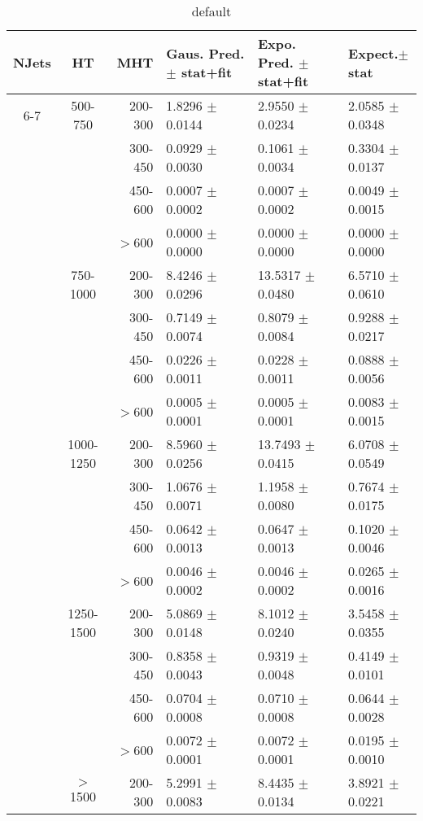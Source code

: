 \documentclass[11pt]{amsart}
\begin{document}
\begin{table}[htdp]
\caption{default}
\begin{center}
\begin{tabular}{|c|c|r|l|l|l|}
\hline

NJets & 	HT 	& MHT 		& Gaus. Pred. $\pm$ stat+fit	& Expo. Pred. $\pm$stat+fit	& Expect.$\pm$stat\\
\hline
6-7& 500-750	& 200-300 & 	1.8296 $\pm$ 0.0144  & 	2.9550 $\pm$ 0.0234  & 	2.0585 $\pm$ 0.0348 \\
  	&				& 300-450 & 	0.0929 $\pm$ 0.0030  & 	0.1061 $\pm$ 0.0034  & 	0.3304 $\pm$ 0.0137 \\
  	&				& 450-600 & 	0.0007 $\pm$ 0.0002  & 	0.0007 $\pm$ 0.0002  & 	0.0049 $\pm$ 0.0015 \\
  	&				& $>$600 & 	0.0000 $\pm$ 0.0000  & 	0.0000 $\pm$ 0.0000  & 	0.0000 $\pm$ 0.0000 \\
  	& 750-1000	& 200-300 & 	8.4246 $\pm$ 0.0296  & 	13.5317 $\pm$ 0.0480  & 	6.5710 $\pm$ 0.0610 \\
  	&				& 300-450 & 	0.7149 $\pm$ 0.0074  & 	0.8079 $\pm$ 0.0084  & 	0.9288 $\pm$ 0.0217 \\
  	&				& 450-600 & 	0.0226 $\pm$ 0.0011  & 	0.0228 $\pm$ 0.0011  & 	0.0888 $\pm$ 0.0056 \\
  	&				& $>$600 & 	0.0005 $\pm$ 0.0001  & 	0.0005 $\pm$ 0.0001  & 	0.0083 $\pm$ 0.0015 \\
  	& 1000-1250	& 200-300 & 	8.5960 $\pm$ 0.0256  & 	13.7493 $\pm$ 0.0415  & 	6.0708 $\pm$ 0.0549 \\
  	&				& 300-450 & 	1.0676 $\pm$ 0.0071  & 	1.1958 $\pm$ 0.0080  & 	0.7674 $\pm$ 0.0175 \\
  	&				& 450-600 & 	0.0642 $\pm$ 0.0013  & 	0.0647 $\pm$ 0.0013  & 	0.1020 $\pm$ 0.0046 \\
  	&				& $>$600 & 	0.0046 $\pm$ 0.0002  & 	0.0046 $\pm$ 0.0002  & 	0.0265 $\pm$ 0.0016 \\
  	& 1250-1500	& 200-300 & 	5.0869 $\pm$ 0.0148  & 	8.1012 $\pm$ 0.0240  & 	3.5458 $\pm$ 0.0355 \\
  	&				& 300-450 & 	0.8358 $\pm$ 0.0043  & 	0.9319 $\pm$ 0.0048  & 	0.4149 $\pm$ 0.0101 \\
  	&				& 450-600 & 	0.0704 $\pm$ 0.0008  & 	0.0710 $\pm$ 0.0008  & 	0.0644 $\pm$ 0.0028 \\
  	&				& $>$600 & 	0.0072 $\pm$ 0.0001  & 	0.0072 $\pm$ 0.0001  & 	0.0195 $\pm$ 0.0010 \\
  	&	$>$1500	& 200-300 & 	5.2991 $\pm$ 0.0083  & 	8.4435 $\pm$ 0.0134  & 	3.8921 $\pm$ 0.0221 \\

\end{tabular}
\end{center}
\end{table}
\end{document}
